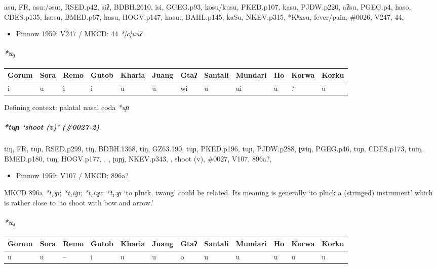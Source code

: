 \documentclass[a4paper,]{article}
\providecommand{\tightlist}{%
  \setlength{\itemsep}{0pt}\setlength{\parskip}{0pt}}
\let\oldparagraph\paragraph
\renewcommand{\paragraph}[1]{\oldparagraph{#1}\mbox{}}
\let\oldsubparagraph\subparagraph
\renewcommand{\subparagraph}[1]{\oldsubparagraph{#1}\mbox{}}
\begin{document}
asu, FR, asu:/əsu:, RSED.p42, siʔ, BDBH.2610, isi, GGEG.p93, kosu/kusu,
PKED.p107, kasu, PJDW.p220, aʔsu, PGEG.p4, haso, CDES.p135, ha:su,
BMED.p67, hasu, HOGV.p147, hasu:, BAHL.p145, kaSu, NKEV.p315, *Kʰxsu,
fever/pain, \#0026, V247, 44,

\begin{itemize}
\tightlist
\item
  Pinnow 1959: V247 / MKCD: 44 \emph{*{[}c{]}uuʔ}
\end{itemize}

\paragraph{\texorpdfstring{\emph{*u₃}}{*u₃}}\label{u-2}

\begin{longtable}[]{@{}llllllllllll@{}}
\toprule
Gorum & Sora & Remo & Gutob & Kharia & Juang & Gtaʔ & Santali & Mundari
& Ho & Korwa & Korku\tabularnewline
\midrule
\endhead
i & u & i & i & u & u & wi & u & ui & u & ? & u\tabularnewline
\bottomrule
\end{longtable}

Defining context: palatal nasal coda \emph{*uɲ}

\subparagraph{\texorpdfstring{\emph{*tuɲ} `shoot (v)'
(\#0027-2)}{*tuɲ shoot (v) (\#0027-2)}}\label{tuux272-shoot-v-0027-2}

tiŋ, FR, tuɲ, RSED.p299, tiŋ, BDBH.1368, tiŋ, GZ63.190, tuɲ, PKED.p196,
tuɲ, PJDW.p288, ʈwiŋ, PGEG.p46, tuɲ, CDES.p173, tuiŋ, BMED.p180, tuŋ,
HOGV.p177, , , ʈuɲj, NKEV.p343, , shoot (v), \#0027, V107, 896a?,

\begin{itemize}
\tightlist
\item
  Pinnow 1959: V107 / MKCD: 896a?
\end{itemize}

MKCD 896a \emph{*t₁iɲ}; \emph{*t₁iiɲ}; \emph{*t₁iəɲ}; \emph{*t₁əɲ} `to
pluck, twang' could be related. Its meaning is generally `to pluck a
(stringed) instrument' which is rather close to `to shoot with bow and
arrow.'

\paragraph{\texorpdfstring{\emph{*u₄}}{*u₄}}\label{u-3}

\begin{longtable}[]{@{}llllllllllll@{}}
\toprule
Gorum & Sora & Remo & Gutob & Kharia & Juang & Gtaʔ & Santali & Mundari
& Ho & Korwa & Korku\tabularnewline
\midrule
\endhead
u & u & -- & i & u & u & o & u & u & u & u & u\tabularnewline
\bottomrule
\end{longtable}
\end{document}

